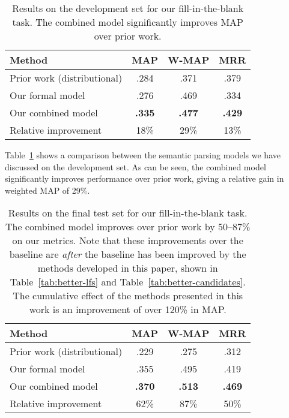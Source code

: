 \documentclass[11pt,letterpaper]{article}
\newcommand{\tabref}[1]{Table~\ref{tab:#1}}
\begin{document}
\begin{table}
  \centering
  {\small
    \begin{tabular}{lccc}
      \toprule
      Method & MAP & W-MAP & MRR \\
      \midrule
      Prior work (distributional) & .284 & .371 & .379 \\
      \midrule
      Our formal model & .276 & .469 & .334 \\
      \midrule
      Our combined model & \textbf{.335} & \textbf{.477} & \textbf{.429} \\
      \midrule
      \midrule
      Relative improvement & 18\% & 29\% & 13\% \\
      \bottomrule
    \end{tabular}
  }
  \caption{Results on the development set for our fill-in-the-blank task.  The
  combined model significantly improves MAP over prior work.}
  \label{tab:dev-results}
\end{table}

\tabref{dev-results} shows a comparison between the semantic parsing models we
have discussed on the development set.  As can be seen, the combined model
significantly improves performance over prior work, giving a relative gain in
weighted MAP of 29\%.

\begin{table}
  \centering
  {\small
    \begin{tabular}{lccc}
      \toprule
      Method & MAP & W-MAP & MRR \\
      \midrule
      Prior work (distributional) & .229 & .275 & .312 \\
      \midrule
      Our formal model & .355 & .495 & .419 \\
      \midrule
      Our combined model & \textbf{.370} & \textbf{.513} & \textbf{.469} \\
      \midrule
      \midrule
      Relative improvement & 62\% & 87\% & 50\% \\
      \bottomrule
    \end{tabular}
  }
  \caption{Results on the final test set for our fill-in-the-blank task.  The
  combined model improves over prior work by 50--87\% on our metrics.  Note
  that these improvements over the baseline are \emph{after} the baseline has
  been improved by the methods developed in this paper, shown in
  \tabref{better-lfs} and \tabref{better-candidates}.  The cumulative effect of
  the methods presented in this work is an improvement of over 120\% in MAP.}
  \label{tab:final-results}
\end{table}
\end{document}
